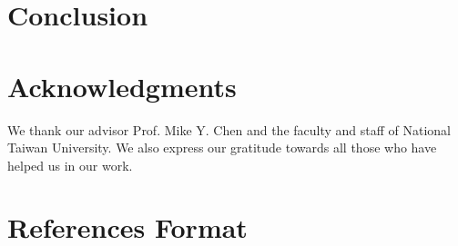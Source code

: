 \documentclass{sigchi}
\begin{document}
\section{Conclusion}



\section{Acknowledgments}
We thank our advisor Prof. Mike Y. Chen and the faculty and staff of National Taiwan University. We also express our gratitude towards all those who have helped us in our work.

%
%
%
%
%
\balance{}

\section{References Format}




\end{document}
